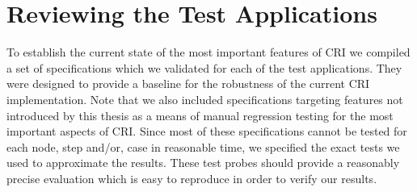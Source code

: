 \section{Reviewing the Test Applications}
\label{sec:EvalTests}
To establish the current state of the most important features of CRI we compiled a set of specifications which we validated for each of the test applications. They were designed to provide a baseline for the robustness of the current CRI implementation. Note that we also included specifications targeting features not introduced by this thesis as a means of manual regression testing for the most important aspects of CRI. Since most of these specifications cannot be tested for each node, step and/or, case in reasonable time, we specified the exact tests we used to approximate the results. These test probes should provide a reasonably precise evaluation which is easy to reproduce in order to verify our results.

